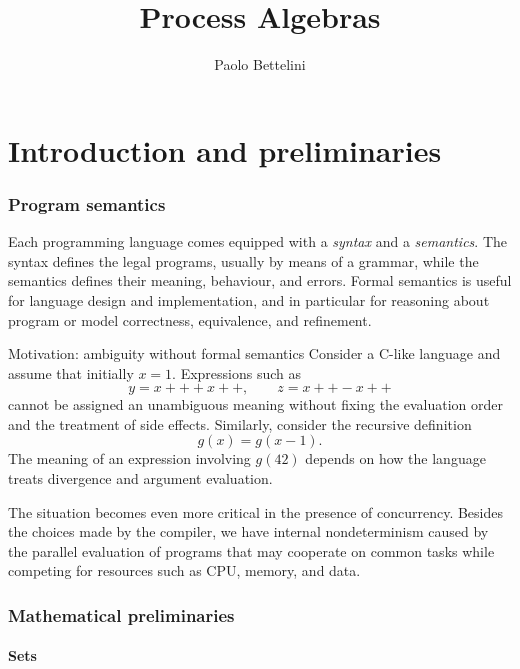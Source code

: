 \documentclass[a4paper]{article}
\title{Process Algebras}
\author{Paolo Bettelini}
\date{}
\begin{document}
\maketitle
\tableofcontents

\pagebreak

\part{Introduction and preliminaries}

\section{Program semantics}

Each programming language comes equipped with a \emph{syntax} and a \emph{semantics}.
The syntax defines the legal programs, usually by means of a grammar, while the semantics defines their meaning, behaviour, and errors.
Formal semantics is useful for language design and implementation, and in particular for reasoning about program or model correctness, equivalence, and refinement.

\begin{snippetexample}{Motivation: ambiguity without formal semantics}
    Consider a C-like language and assume that initially \(x=1\).
    Expressions such as
    \[
        y = x++ + x++,
        \qquad
        z = x++ - x++
    \]
    cannot be assigned an unambiguous meaning without fixing the evaluation order and the treatment of side effects.
    Similarly, consider the recursive definition
    \[
        g(x)=g(x-1).
    \]
    The meaning of an expression involving \(g(42)\) depends on how the language treats divergence and argument evaluation.

    The situation becomes even more critical in the presence of concurrency.
    Besides the choices made by the compiler, we have internal nondeterminism caused by the parallel evaluation of programs that may cooperate on common tasks while competing for resources such as CPU, memory, and data.
\end{snippetexample}

\section{Mathematical preliminaries}

\subsection{Sets}
\end{document}
